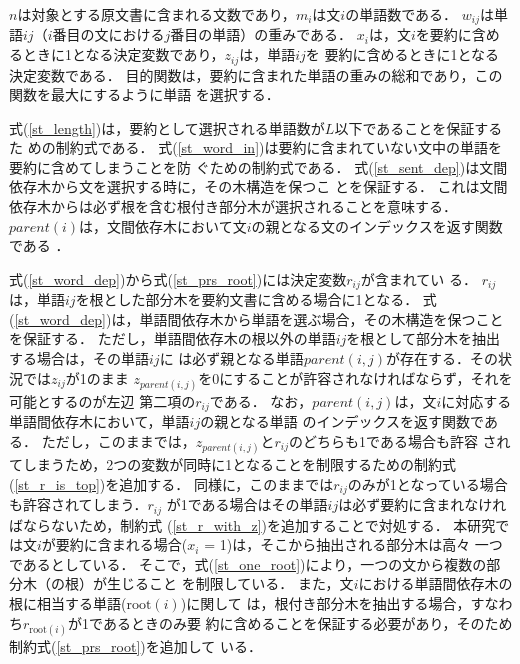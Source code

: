 \documentclass[japanese]{jnlp_1.4}
\begin{document}
$n$は対象とする原文書に含まれる文数であり，$m_i$は文$i$の単語数である．
$w_{ij}$は単語$ij$（$i$番目の文における$j$番目の単語）の重みである．
$x_i$は，文$i$を要約に含めるときに1となる決定変数であり，$z_{ij}$は，単語$ij$を
要約に含めるときに1となる決定変数である．
目的関数は，要約に含まれた単語の重みの総和であり，この関数を最大にするように単語
を選択する．

式(\ref{st_length})は，要約として選択される単語数が$L$以下であることを保証するた
めの制約式である．
式(\ref{st_word_in})は要約に含まれていない文中の単語を要約に含めてしまうことを防
ぐための制約式である．
式(\ref{st_sent_dep})は文間依存木から文を選択する時に，その木構造を保つこ
とを保証する．
これは文間依存木からは必ず根を含む根付き部分木が選択されることを意味する．
$parent(i)$は，文間依存木において文$i$の親となる文のインデックスを返す関数である
．

式(\ref{st_word_dep})から式(\ref{st_prs_root})には決定変数$r_{ij}$が含まれてい
る．
$r_{ij}$は，単語$ij$を根とした部分木を要約文書に含める場合に1となる．
式(\ref{st_word_dep})は，単語間依存木から単語を選ぶ場合，その木構造を保つこと
を保証する．
ただし，単語間依存木の根以外の単語${ij}$を根として部分木を抽出する場合は，その単語${ij}$に
は必ず親となる単語$parent(i,j)$が存在する．その状況では$z_{ij}$が1のまま
$z_{parent(i,j)}$を0にすることが許容されなければならず，それを可能とするのが左辺
第二項の$r_{ij}$である．
なお，$parent(i,j)$は，文$i$に対応する単語間依存木において，単語$ij$の親となる単語
のインデックスを返す関数である．
ただし，このままでは，$z_{parent(i,j)}$と$r_{ij}$のどちらも1である場合も許容
されてしまうため，2つの変数が同時に1となることを制限するための制約式
(\ref{st_r_is_top})を追加する．
同様に，このままでは$r_{ij}$のみが1となっている場合も許容されてしまう．$r_{ij}$
が1である場合はその単語$ij$は必ず要約に含まれなければならないため，制約式
(\ref{st_r_with_z})を追加することで対処する．
本研究では文$i$が要約に含まれる場合($x_i$ = 1)は，そこから抽出される部分木は高々
一つであるとしている．
そこで，式(\ref{st_one_root})により，一つの文から複数の部分木（の根）が生じること
を制限している．
また，文$i$における単語間依存木の根に相当する単語($\text{root}(i)$)に関して
は，根付き部分木を抽出する場合，すなわち$r_{\text{root}(i)}$が1であるときのみ要
約に含めることを保証する必要があり，そのため制約式(\ref{st_prs_root})を追加して
いる．
\end{document}
